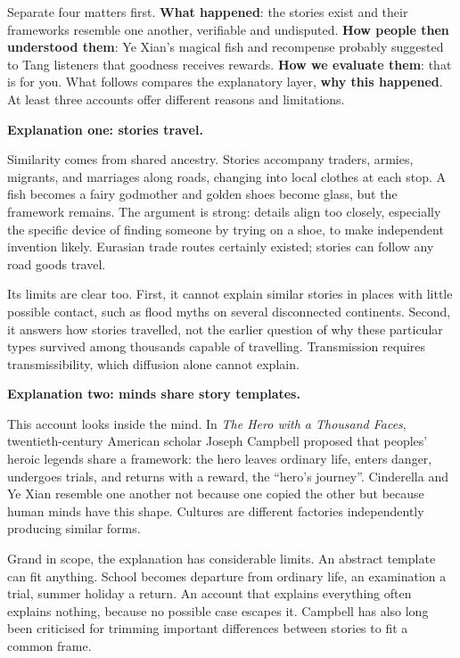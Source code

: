 Separate four matters first. \textbf{What happened}: the stories exist and their frameworks resemble one another, verifiable and undisputed. \textbf{How people then understood them}: Ye Xian's magical fish and recompense probably suggested to Tang listeners that goodness receives rewards. \textbf{How we evaluate them}: that is for you. What follows compares the explanatory layer, \textbf{why this happened}. At least three accounts offer different reasons and limitations.

\textbf{Explanation one: stories travel.}

Similarity comes from shared ancestry. Stories accompany traders, armies, migrants, and marriages along roads, changing into local clothes at each stop. A fish becomes a fairy godmother and golden shoes become glass, but the framework remains. The argument is strong: details align too closely, especially the specific device of finding someone by trying on a shoe, to make independent invention likely. Eurasian trade routes certainly existed; stories can follow any road goods travel.

Its limits are clear too. First, it cannot explain similar stories in places with little possible contact, such as flood myths on several disconnected continents. Second, it answers how stories travelled, not the earlier question of why these particular types survived among thousands capable of travelling. Transmission requires transmissibility, which diffusion alone cannot explain.

\textbf{Explanation two: minds share story templates.}

This account looks inside the mind. In \emph{The Hero with a Thousand Faces}, twentieth-century American scholar Joseph Campbell proposed that peoples' heroic legends share a framework: the hero leaves ordinary life, enters danger, undergoes trials, and returns with a reward, the ``hero's journey''. Cinderella and Ye Xian resemble one another not because one copied the other but because human minds have this shape. Cultures are different factories independently producing similar forms.

Grand in scope, the explanation has considerable limits. An abstract template can fit anything. School becomes departure from ordinary life, an examination a trial, summer holiday a return. An account that explains everything often explains nothing, because no possible case escapes it. Campbell has also long been criticised for trimming important differences between stories to fit a common frame.

